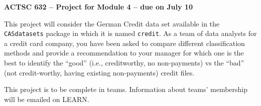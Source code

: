 \documentclass[11pt]{article}
\begin{document}
\begin{center}
{\large \bf ACTSC 632 -- Project for Module 4 -- due on July 10} \\

\end{center}

This project will consider the German Credit data set available in the {\tt CASdatasets} package in which it is named {\tt credit}.  As a team of data analysts for a credit card company, you have been asked to compare different classification methods and provide a recommendation to your manager for which one is the best to identify the ``good'' (i.e., creditworthy, no non-payments) vs the ``bad'' (not credit-worthy, having existing non-payments) credit files.

This project is to be complete in teams. Information about teams' membership will be emailed on LEARN.
\end{document}
